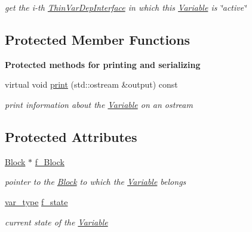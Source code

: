 \begin{DoxyCompactItemize}
\begin{DoxyCompactList}\small\item\em get the i-\/th \mbox{\hyperlink{class_s_m_spp__di__unipi__it_1_1_thin_var_dep_interface}{Thin\+Var\+Dep\+Interface}} in which this \mbox{\hyperlink{class_s_m_spp__di__unipi__it_1_1_variable}{Variable}} is \char`\"{}active\char`\"{} \end{DoxyCompactList}\end{DoxyCompactItemize}

\subsection*{Protected Member Functions}
\begin{Indent}\textbf{ Protected methods for printing and serializing}\par
\begin{DoxyCompactItemize}
\item 
virtual void \mbox{\hyperlink{class_s_m_spp__di__unipi__it_1_1_variable_a2e7b9c9148a98c5c342e8c25cac95926}{print}} (std\+::ostream \&output) const
\begin{DoxyCompactList}\small\item\em print information about the \mbox{\hyperlink{class_s_m_spp__di__unipi__it_1_1_variable}{Variable}} on an ostream \end{DoxyCompactList}\end{DoxyCompactItemize}
\end{Indent}
\subsection*{Protected Attributes}
\begin{DoxyCompactItemize}
\item 
\mbox{\label{class_s_m_spp__di__unipi__it_1_1_variable_a372d458e214710b23cf375b9a6edc5fc}} 
\mbox{\hyperlink{class_s_m_spp__di__unipi__it_1_1_block}{Block}} $\ast$ \mbox{\hyperlink{class_s_m_spp__di__unipi__it_1_1_variable_a372d458e214710b23cf375b9a6edc5fc}{f\+\_\+\+Block}}
\begin{DoxyCompactList}\small\item\em pointer to the \mbox{\hyperlink{class_s_m_spp__di__unipi__it_1_1_block}{Block}} to which the \mbox{\hyperlink{class_s_m_spp__di__unipi__it_1_1_variable}{Variable}} belongs \end{DoxyCompactList}\item 
\mbox{\label{class_s_m_spp__di__unipi__it_1_1_variable_acb7baf0976c5a003f3e41755398f3747}} 
\mbox{\hyperlink{class_s_m_spp__di__unipi__it_1_1_variable_a32378add5594ab0f1fb45e711d88924d}{var\+\_\+type}} \mbox{\hyperlink{class_s_m_spp__di__unipi__it_1_1_variable_acb7baf0976c5a003f3e41755398f3747}{f\+\_\+state}}
\begin{DoxyCompactList}\small\item\em current state of the \mbox{\hyperlink{class_s_m_spp__di__unipi__it_1_1_variable}{Variable}} \end{DoxyCompactList}\end{DoxyCompactItemize}

